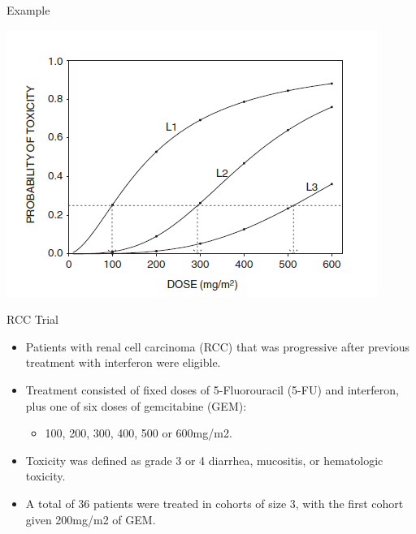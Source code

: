 \documentclass{beamer}
\begin{document}
\begin{frame}{Example}

\begin{center}\includegraphics[scale=0.8]{images/BLR.png} \end{center}

\end{frame}

\begin{frame}{RCC Trial}

\begin{itemize}
\item
  Patients with renal cell carcinoma (RCC) that was progressive after
  previous treatment with interferon were eligible.
\item
  Treatment consisted of fixed doses of 5-Fluorouracil (5-FU) and
  interferon, plus one of six doses of gemcitabine (GEM):

  \begin{itemize}
  \itemsep1pt\parskip0pt
  \item
    100, 200, 300, 400, 500 or 600mg/m2.
  \end{itemize}
\item
  Toxicity was defined as grade 3 or 4 diarrhea, mucositis, or
  hematologic toxicity.
\item
  A total of 36 patients were treated in cohorts of size 3, with the
  first cohort given 200mg/m2 of GEM.
\end{itemize}

\end{frame}
\end{document}
